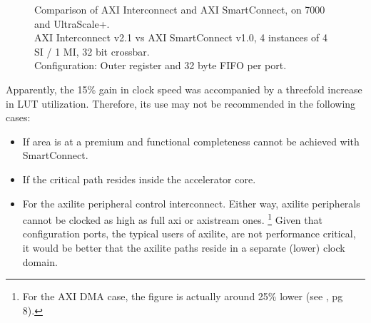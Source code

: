\begin{figure}[ht!]
\centering
{}
\caption{Comparison of AXI Interconnect and AXI SmartConnect, on 7000 and UltraScale+.\\
	AXI Interconnect v2.1 vs AXI SmartConnect v1.0, 4 instances of 4 SI / 1 MI, 32 bit crossbar.\\
	Configuration: Outer register and 32 byte FIFO per port.}
\label{tab:smartconnect}
\end{figure}

Apparently, the 15\% gain in clock speed was accompanied by a threefold increase in LUT utilization.
Therefore, its use may not be recommended in the following cases:

\begin{itemize}
\item	If area is at a premium and functional completeness cannot be achieved with SmartConnect.
\item	If the critical path resides inside the accelerator core.
\item	For the \gls{axilite} peripheral control interconnect. Either way, \gls{axilite} peripherals
	cannot be clocked as high as full \gls{axi} or \gls{axistream} ones.
	\footnote{For the AXI DMA case, the figure is actually around 25\%
	lower (see \cite{pg021}, pg 8).} Given that configuration
	ports, the typical users of \gls{axilite}, are not performance critical, it would be
	better that the \gls{axilite} paths reside in a separate (lower) clock domain.
\end{itemize}

